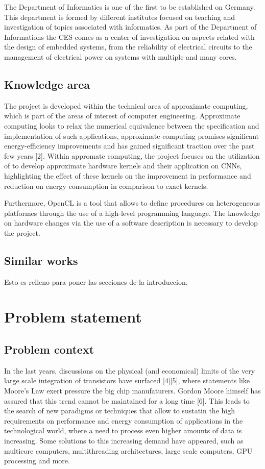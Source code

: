 The Department of Informatics is one of the first to be established on Germany. This department is formed
by different institutes focused on teaching and investigation of topics associated with informatics. As
part of the Department of Informations the CES comes as a center of investigation on aspects related
with the design of embedded systems, from the reliability of electrical circuits to the management of
electrical power on systems with multiple and many cores.

\subsection{Knowledge area}

The project is developed within the technical area of approximate computing, which is part of the areas
of interest of computer engineering. Approximate computing looks to relax the numerical equivalence 
between the specification and implementation of such applications, approximate computing promises significant 
energy-efficiency improvements and has gained significant traction over the past few years [2]. Within
appromate computing, the project focuses on the utilization of \intelOCL to develop approximate hardware
kernels and their application on CNNs, highlighting the effect of these kernels on the improvement in 
performance and reduction on energy consumption in comparison to exact kernels.

Furthermore, OpenCL is a tool that allows to define procedures on heterogeneous platformes through the 
use of a high-level programming language. The knowledge on hardware changes via the use of a software 
description is necessary to develop the project.

\subsection{Similar works}

Esto es relleno para poner las secciones de la introduccion.

\section{Problem statement}

\subsection{Problem context}

In the last years, discussions on the physical (and economical) limits of the very large scale integration 
of transistors have surfaced [4][5], where statements like Moore's Law exert pressure the big chip manufaturers.
Gordon Moore himself has assured that this trend cannot be maintained for a long time [6]. This leads to the
search of new paradigms or techniques that allow to sustatin the high requirements on performance and 
energy consumption of applications in the technological world, where a need to process even higher amounts
of data is increasing. Some solutions to this increasing demand have appeared, such as multicore computers,
multithreading architectures, large scale computers, GPU processing and more.

